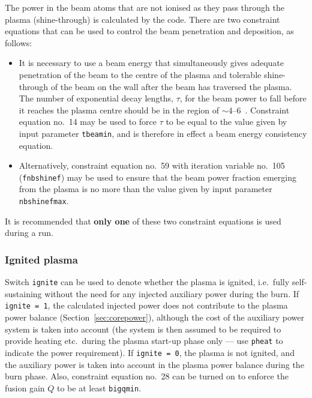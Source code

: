 \documentclass[11pt,a4paper]{report}
\begin{document}
The power in the beam atoms that are not ionised as they pass through the plasma (shine-through) is calculated by the code.  There are two constraint equations that can be used to control the beam
penetration and deposition, as follows:
\begin{itemize}

\item It is necessary to use a beam energy that simultaneously gives adequate
  penetration of the beam to the centre of the plasma and tolerable
  shine-through of the beam on the wall after the beam has traversed the
  plasma. The number of exponential decay lengths, $\tau$, for the beam power
  to fall before it reaches the plasma centre should be in the region of $\sim
  4$--6~\cite[Section 4.3.2]{172}. Constraint equation no.\ 14 may be used to
  force $\tau$ to be equal to the value given by input parameter
  \texttt{tbeamin}, and is therefore in effect a beam energy consistency
  equation.

\item Alternatively, constraint equation no.\ 59 with iteration variable no.\
  105 (\texttt{fnbshinef}) may be used to ensure that the beam power fraction
  emerging from the plasma is no more than the value given by input parameter
  \texttt{nbshinefmax}.

\end{itemize}

It is recommended that \textbf{only one} of these two constraint equations is
used during a run.

\subsubsection{Ignited plasma}
\label{sec:ignited}

Switch \texttt{ignite} can be used to denote whether the plasma is ignited,
i.e.\ fully self-sustaining without the need for any injected auxiliary power
during the burn. If \texttt{ignite = 1}, the calculated injected power does
not contribute to the plasma power balance (Section~\ref{sec:corepower}),
although the cost of the auxiliary power system is taken into account (the
system is then assumed to be required to provide heating etc.\ during the
plasma start-up phase only --- use \texttt{pheat} to indicate the power
requirement). If \texttt{ignite = 0}, the plasma is not ignited, and the
auxiliary power is taken into account in the plasma power balance during the
burn phase. Also, constraint equation no.\ 28 can be turned on to enforce the
fusion gain $Q$ to be at least \texttt{bigqmin}.
\end{document}
